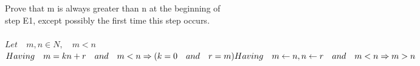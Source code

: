\documentclass{article}
\begin{document}
Prove that m is always greater than n at the beginning of\\
step E1, except possibly the first time this step occurs.\\\\
$Let \quad m, n \in  N, \quad m < n$\\
$
Having \quad m = kn + r \quad and \quad m < n\\
\Rightarrow (k = 0 \quad and \quad r =  m)\\
Having \quad m \leftarrow n, n \leftarrow r \quad and \quad m < n\\
\Rightarrow m > n\\
$
\end{document}
